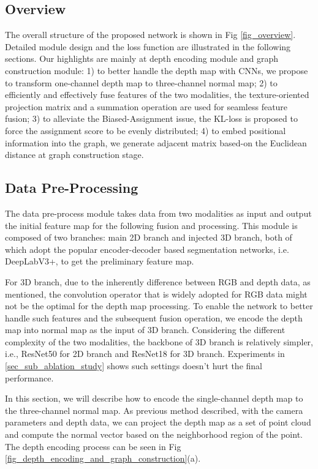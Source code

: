 ﻿\documentclass[journal]{IEEEtran}
\begin{document}
\subsection{Overview}  \label{sec_sub_overview}
 
    The overall structure of the proposed network is shown in Fig \ref{fig_overview}. Detailed module design and the loss function are illustrated in the following sections. Our highlights are mainly at depth encoding module and graph construction module: 1) to better handle the depth map with CNNs, we propose to transform one-channel depth map to three-channel normal map; 2) to efficiently and effectively fuse features of the two modalities, the texture-oriented projection matrix and a summation operation are used for seamless feature fusion; 3) to alleviate the Biased-Assignment issue, the KL-loss is proposed to force the assignment score to be evenly distributed; 4) to embed positional information into the graph, we generate adjacent matrix based-on the Euclidean distance at graph construction stage. 

\subsection{Data Pre-Processing}  \label{sec_sub_depth_process}
 
    The data pre-process module takes data from two modalities as input and output the initial feature map for the following fusion and processing. This module is composed of two branches: main 2D branch and injected 3D branch, both of which adopt the popular encoder-decoder based segmentation networks, i.e. DeepLabV3+, to get the preliminary feature map. 

     
    For 3D branch, due to the inherently difference between RGB and depth data, as \cite{2021shapeconv} mentioned, the convolution operator that is widely adopted for RGB data might not be the optimal for the depth map processing. To enable the network to better handle such features and the subsequent fusion operation, we encode the depth map into normal map as the input of 3D branch. Considering the different complexity of the two modalities, the backbone of 3D branch is relatively simpler, i.e., ResNet50 for 2D branch and ResNet18 for 3D branch. Experiments in \ref{sec_sub_ablation_study} shows such settings doesn't hurt the final performance. 

 
    In this section, we will describe how to encode the single-channel depth map to the three-channel normal map. As previous method \cite{yin2018geonet} described, with the camera parameters and depth data, we can project the depth map as a set of point cloud and compute the normal vector based on the neighborhood region of the point. The depth encoding process can be seen in Fig \ref{fig_depth_encoding_and_graph_construction}(a).
 
\end{document}
